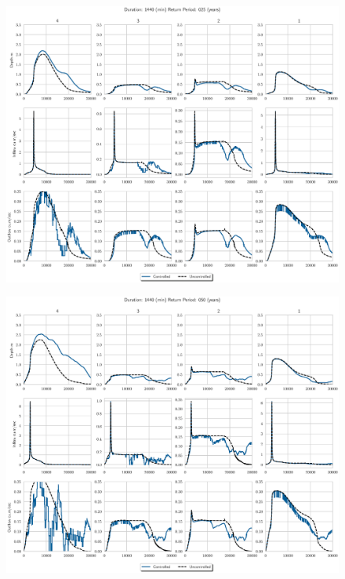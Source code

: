 \begin{figure}
    \centering
    \includegraphics[width=\linewidth]{./RL-SI-figures/77storms/1440025.eps}
\end{figure}
\begin{figure}
    \centering
    \includegraphics[width=\linewidth]{./RL-SI-figures/77storms/1440050.eps}
\end{figure}
